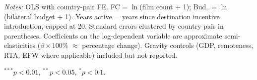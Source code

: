 \begin{table}[htbp]
\begin{minipage}{\textwidth}
\footnotesize
\par \textit{Notes:} OLS with country-pair FE. FC = $\ln$(film count + 1); Bud.\ = $\ln$(bilateral budget + 1). Years active = years since destination incentive introduction, capped at 20. Standard errors clustered by country pair in parentheses. Coefficients on the log-dependent variable are approximate semi-elasticities ($\beta \times 100\%$ $\approx$ percentage change). Gravity controls (GDP, remoteness, RTA, EFW where applicable) included but not reported.
\par $^{***}p<0.01$, $^{**}p<0.05$, $^{*}p<0.1$.
\end{minipage}
\end{table}

\clearpage


